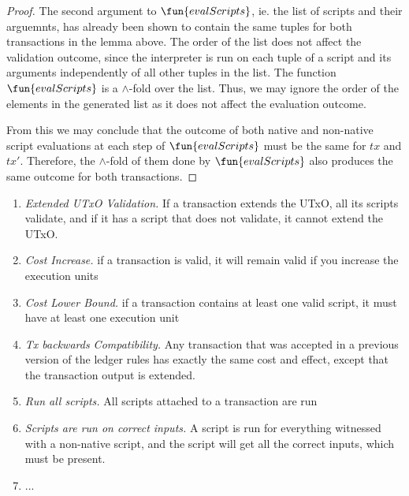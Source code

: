 \begin{property}
\begin{proof}

    The second argument to $\fun{evalScripts}$, ie. the list of scripts and their arguemnts,
    has already been shown to contain the same tuples for both transactions in the lemma above.
    The order of the list does not affect the validation outcome, since the interpreter is run
    on each tuple of a script and its arguments independently of all other tuples in the list.
    The function $\fun{evalScripts}$ is a $\wedge$-fold over the list. Thus, we may ignore the order
    of the elements in the generated list as it does not affect the evaluation outcome.

    From this we may conclude that the outcome of both native and non-native script evaluations
    at each step of $\fun{evalScripts}$ must be the same for $tx$ and $tx'$. Therefore,
    the $\wedge$-fold of them done by $\fun{evalScripts}$ also produces the same outcome
    for both transactions.

\end{proof}
\end{property}

\begin{enumerate}
\item
  \emph{Extended UTxO Validation.}
  If a transaction extends the UTxO, all its scripts validate, and
  if it has a script that does not validate, it cannot extend the
  UTxO.
\item
  \emph{Cost Increase.} if a transaction is valid, it will remain valid if you increase the execution units
\item
  \emph{Cost Lower Bound.} if a transaction contains at least one valid script, it must have at least one execution unit
\item
  \emph{Tx backwards Compatibility.} Any transaction that was accepted in a previous version of the ledger rules
    has exactly the same cost and effect, except that the transaction output is extended.
\item \emph{Run all scripts.} All scripts attached to a transaction are run
\item \emph{Scripts are run on correct inputs.}
  A script is run for everything witnessed with a non-native script, and the script will
get all the correct inputs, which must be present.
\item
  ... 
\end{enumerate}
